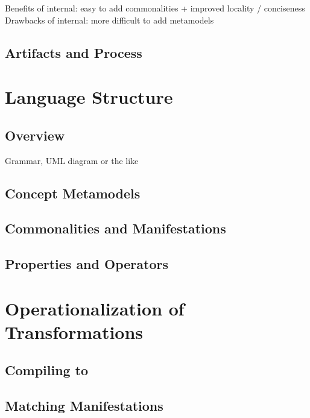 Benefits of internal: easy to add commonalities + improved locality / conciseness
Drawbacks of internal: more difficult to add metamodels

\subsection{Artifacts and Process}



\section{Language Structure}

\subsection{Overview}
Grammar, UML diagram or the like

\subsection{Concept Metamodels}

\subsection{Commonalities and Manifestations}

\subsection{Properties and Operators}


\section{Operationalization of Transformations}

\subsection{Compiling to \reactions}

\subsection{Matching Manifestations}

